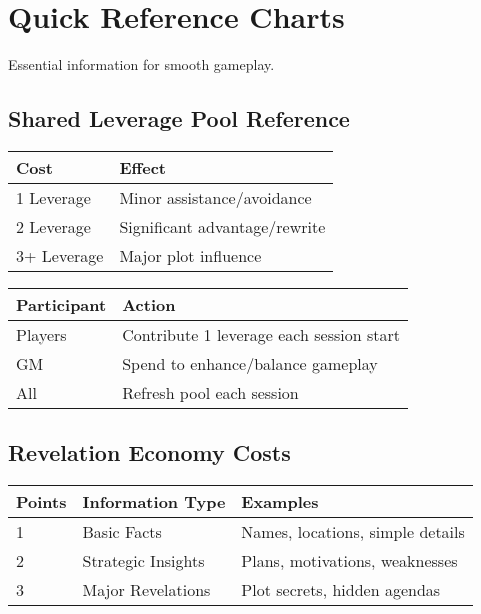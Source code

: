 \section{Quick Reference Charts}

Essential information for smooth gameplay.

\subsection{Shared Leverage Pool Reference}
\begin{center}
\begin{tabular}{|l|l|}
\hline
\textbf{Cost} & \textbf{Effect} \\
\hline
1 Leverage & Minor assistance/avoidance \\
2 Leverage & Significant advantage/rewrite \\
3+ Leverage & Major plot influence \\
\hline
\end{tabular}
\end{center}

\begin{center}
\begin{tabular}{|l|l|}
\hline
\textbf{Participant} & \textbf{Action} \\
\hline
Players & Contribute 1 leverage each session start \\
GM & Spend to enhance/balance gameplay \\
All & Refresh pool each session \\
\hline
\end{tabular}
\end{center}

\subsection{Revelation Economy Costs}
\begin{center}
\begin{tabular}{|l|l|l|}
\hline
\textbf{Points} & \textbf{Information Type} & \textbf{Examples} \\
\hline
1 & Basic Facts & Names, locations, simple details \\
2 & Strategic Insights & Plans, motivations, weaknesses \\
3 & Major Revelations & Plot secrets, hidden agendas \\
\hline
\end{tabular}
\end{center}


